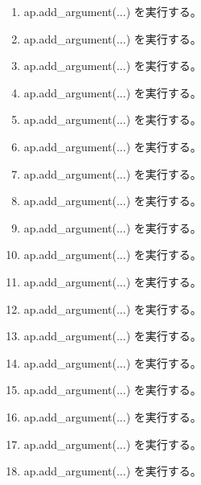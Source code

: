\documentclass[a4paper,11pt]{article}
\begin{document}
\begin{enumerate}[leftmargin=1.8em]
\item ap.add\_argument(...) を実行する。
\item ap.add\_argument(...) を実行する。
\item ap.add\_argument(...) を実行する。
\item ap.add\_argument(...) を実行する。
\item ap.add\_argument(...) を実行する。
\item ap.add\_argument(...) を実行する。
\item ap.add\_argument(...) を実行する。
\item ap.add\_argument(...) を実行する。
\item ap.add\_argument(...) を実行する。
\item ap.add\_argument(...) を実行する。
\item ap.add\_argument(...) を実行する。
\item ap.add\_argument(...) を実行する。
\item ap.add\_argument(...) を実行する。
\item ap.add\_argument(...) を実行する。
\item ap.add\_argument(...) を実行する。
\item ap.add\_argument(...) を実行する。
\item ap.add\_argument(...) を実行する。
\item ap.add\_argument(...) を実行する。
            \end{enumerate}
\end{document}
